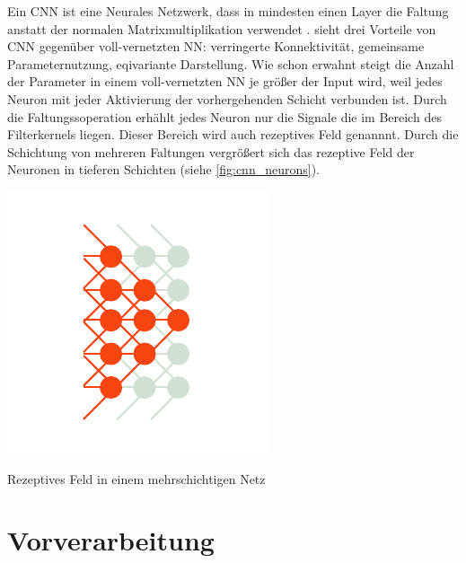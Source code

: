 Ein CNN ist eine Neurales Netzwerk, dass in mindesten einen Layer die Faltung anstatt der normalen Matrixmultiplikation verwendet \parencite[321]{GoodfellowDeeplearning2016}.
\cite{GoodfellowDeeplearning2016} sieht drei Vorteile von CNN gegenüber voll-vernetzten NN: verringerte Konnektivität, 
gemeinsame Parameternutzung, eqivariante Darstellung.
Wie schon erwahnt steigt die Anzahl der Parameter in einem voll-vernetzten NN je größer der Input wird, weil jedes Neuron mit jeder Aktivierung der vorhergehenden Schicht verbunden ist. 
Durch die Faltungssoperation erhählt jedes Neuron nur die Signale die im Bereich des Filterkernels liegen. Dieser Bereich wird auch rezeptives Feld genannnt.
Durch die Schichtung von mehreren Faltungen vergrößert sich das rezeptive Feld der Neuronen in tieferen Schichten (siehe \cref{fig:cnn_neurons}).


\begin{marginfigure}
    \label{fig:cnn_neurons}
    \includegraphics[width=\textwidth]{figures/sketch/cnn/perceptive_field.pdf}
    \caption{Rezeptives Feld in einem mehrschichtigen Netz}
\end{marginfigure}

\qq{}


\section{Vorverarbeitung}

